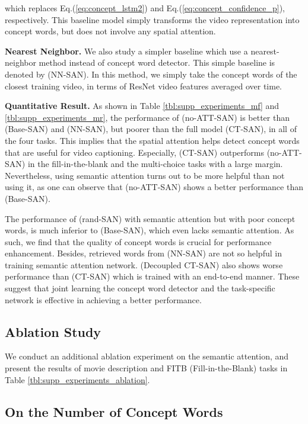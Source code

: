 \documentclass[10pt,twocolumn,letterpaper]{article}
\theoremstyle{nonumberplain}
\begin{document}
which replaces Eq.(\ref{eq:concept_lstm2}) and Eq.(\ref{eq:concept_confidence_p}), respectively.
This baseline model simply transforms the video representation
into concept words, but does not involve any spatial attention.

\smallskip
\textbf{Nearest Neighbor.}
We also study a simpler baseline which use a nearest-neighbor method
instead of concept word detector.
This simple baseline is denoted by {(NN-SAN)}.
In this method, we simply take the concept words of the closest training video,
in terms of ResNet video features averaged over time.




\smallskip
\textbf{Quantitative Result.}{}
As shown in Table \ref{tbl:supp_experiments_mf} and \ref{tbl:supp_experiments_mr},
the performance of (no-ATT-SAN) is better than (Base-SAN) and (NN-SAN),
but poorer than the full model (CT-SAN),
in all of the four tasks.
This implies that the spatial attention helps detect concept words that are useful for video captioning.
Especially, (CT-SAN) outperforms (no-ATT-SAN) in the fill-in-the-blank and the multi-choice tasks with a large margin.
Nevertheless, using semantic attention turns out to be
more helpful than not using it,
as one can observe that (no-ATT-SAN) shows a better performance than (Base-SAN).

The performance of (rand-SAN) with semantic attention but with poor concept words,
is much inferior to (Base-SAN), which even lacks semantic attention.
As such, we find that the quality of concept words is crucial for performance enhancement.
Besides, retrieved words from (NN-SAN) are not so helpful in training semantic attention network.
(Decoupled CT-SAN) also shows worse performance than (CT-SAN) which is trained with an end-to-end manner.
These suggest that joint learning the concept word detector and the task-specific network
is effective in achieving a better performance.

\subsection{Ablation Study}

We conduct an additional ablation experiment on the semantic attention,
and present the results of movie description and FITB (Fill-in-the-Blank) tasks in Table \ref{tbl:supp_experiments_ablation}.




\subsection{On the Number of Concept Words}
\end{document}
